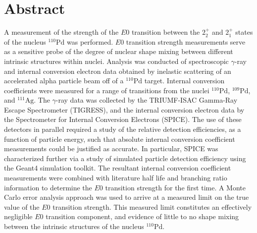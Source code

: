 
\chapter{Abstract}

A measurement of the strength of the $E0$ transition between the $2_2^+$ and $2_1^+$ states of the nucleus $^{110}\mathrm{Pd}$ was performed. $E0$ transition strength measurements serve as a sensitive probe of the degree of nuclear shape mixing between different intrinsic structures within nuclei. Analysis was conducted of spectroscopic $\gamma$-ray and internal conversion electron data obtained by inelastic scattering of an accelerated alpha particle beam off of a $^{110}\mathrm{Pd}$ target. Internal conversion coefficients were measured for a range of transitions from the nuclei $^{110}\mathrm{Pd}$, $^{109}\mathrm{Pd}$, and $^{111}\mathrm{Ag}$. The $\gamma$-ray data was collected by the TRIUMF-ISAC Gamma-Ray Escape Spectrometer (TIGRESS), and the internal conversion electron data by the Spectrometer for Internal Conversion Electrons (SPICE). The use of these detectors in parallel required a study of the relative detection efficiencies, as a function of particle energy, such that absolute internal conversion coefficient measurements could be justified as accurate. In particular, SPICE was characterized further via a study of simulated particle detection efficiency using the Geant4 simulation toolkit. The resultant internal conversion coefficient measurements were combined with literature half life and branching ratio information to determine the $E0$ transition strength for the first time. A Monte Carlo error analysis approach was used to arrive at a measured limit on the true value of the $E0$ transition strength. This measured limit constitutes an effectively negligible $E0$ transition component, and evidence of little to no shape mixing between the intrinsic structures of the nucleus $^{110}\mathrm{Pd}$.

